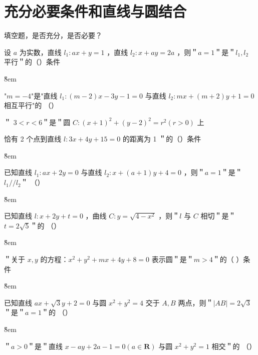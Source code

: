 \section{充分必要条件和直线与圆结合}

\begin{tips}
    填空题，是否充分，是否必要？
\end{tips}

\begin{example}
    设 $a$ 为实数，直线 $l_1: a x+y=1$ ，直线 $l_2: x+a y=2 a$ ，则＂$a=1$＂是＂$l_1, l_2$ 平行＂的（\quad）条件
\end{example}

\v{8em}

\begin{example}
    "$m=-4$"是"直线 $l_1:(m-2) x-3 y-1=0$ 与直线 $l_2: m x+(m+2) y+1=0$ 相互平行"的 （\qquad）
\end{example}

\begin{example}
    ＂ $3<r<6$＂是＂圆 $C:(x+1)^2+(y-2)^2=r^2(r>0)$ 上

    恰有 2 个点到直线 $l: 3 x+4 y+15=0$ 的距离为 1 ＂的（\quad ）条件
\end{example}

\v{8em}

\begin{example}
    已知直线 $l_1: a x+2 y=0$ 与直线 $l_2: x+(a+1) y+4=0$ ，则＂$a=1$＂是＂$l_1 / / l_2$＂ （\qquad）
\end{example}

\v{8em}

\begin{example}
    已知直线 $l: x+2 y+t=0$ ，曲线 $C: y=\sqrt{4-x^2}$ ，则＂$l$ 与 $C$ 相切＂是＂$t=2 \sqrt{5}$＂的 （\qquad）
\end{example}

\v{8em}

\begin{example}
    ＂关于 $x, y$ 的方程：$x^2+y^2+m x+4 y+8=0$ 表示圆＂是＂$m>4$＂的（ \quad）条件
\end{example}

\v{8em}

\begin{example}
    已知直线 $a x+\sqrt{3} y+2=0$ 与圆 $x^2+y^2=4$ 交于 $A, B$ 两点，则＂$|A B|=2 \sqrt{3}$＂是＂$a=1$＂的 （\qquad）
\end{example}

\v{8em}

\begin{example}
    ＂$a>0$＂是＂直线 $x-a y+2 a-1=0(a \in \mathbf{R})$ 与圆 $x^2+y^2=1$ 相交＂的 （\qquad）
\end{example}

